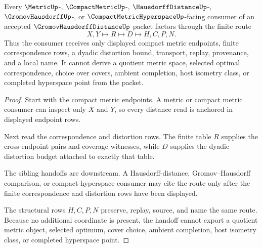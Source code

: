 \begin{theorem}
\label{thm:gromov-hausdorff-distance-compact-metric-handoff}
Every $\MetricUp$-, $\CompactMetricUp$-, $\HausdorffDistanceUp$-, $\GromovHausdorffUp$-, or $\CompactMetricHyperspaceUp$-facing consumer of an accepted $\GromovHausdorffDistanceUp$ packet factors through the finite route
$$
X,Y \longmapsto R \longmapsto D \longmapsto H,C,P,N .
$$
Thus the consumer receives only displayed compact metric endpoints, finite correspondence rows, a dyadic distortion bound, transport, replay, provenance, and a local name. It cannot derive a quotient metric space, selected optimal correspondence, choice over covers, ambient completion, host isometry class, or completed hyperspace point from the packet.
\end{theorem}
\begin{proof}
Start with the compact metric endpoints. A metric or compact metric consumer can inspect only $X$ and $Y$, so every distance read is anchored in displayed endpoint rows.

Next read the correspondence and distortion rows. The finite table $R$ supplies the cross-endpoint pairs and coverage witnesses, while $D$ supplies the dyadic distortion budget attached to exactly that table.

The sibling handoffs are downstream. A Hausdorff-distance, Gromov--Hausdorff comparison, or compact-hyperspace consumer may cite the route only after the finite correspondence and distortion rows have been displayed.

The structural rows $H,C,P,N$ preserve, replay, source, and name the same route. Because no additional coordinate is present, the handoff cannot export a quotient metric object, selected optimum, cover choice, ambient completion, host isometry class, or completed hyperspace point.
\end{proof}


